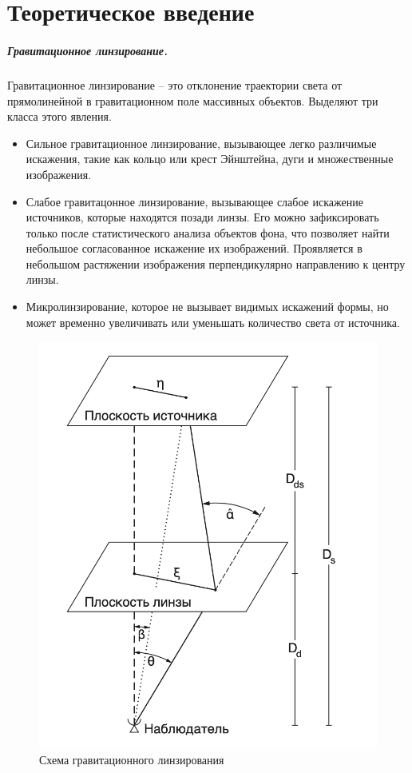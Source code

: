\documentclass[12pt,a4paper]{article}
\begin{document}
\section*{Теоретическое введение}
\subparagraph*{Гравитационное линзирование.}
Гравитационное линзирование – это отклонение траектории света от прямолинейной в гравитационном поле массивных объектов. 
Выделяют три класса этого явления.
\begin{itemize}
    \item Сильное гравитационное линзирование, вызывающее легко различимые искажения, такие как кольцо или крест Эйнштейна, дуги и множественные изображения.
    \item Слабое гравитацонное линзирование, вызывающее слабое искажение источников, которые находятся позади линзы. 
    Его можно зафиксировать только после статистического анализа объектов фона, что позволяет найти небольшое согласованное искажение их изображений. 
    Проявляется в небольшом растяжении изображения перпендикулярно направлению к центру линзы.
    \item Микролинзирование, которое не вызывает видимых искажений формы, но может временно увеличивать или уменьшать количество света от источника.
\end{itemize}

\begin{figure}
    \centering
    \includegraphics[width=\linewidth]{sources/scheme.png}
    \caption{\small{Схема гравитационного линзирования \cite{gravlens_strong_weak_micro}}}
\end{figure}  
\end{document}
